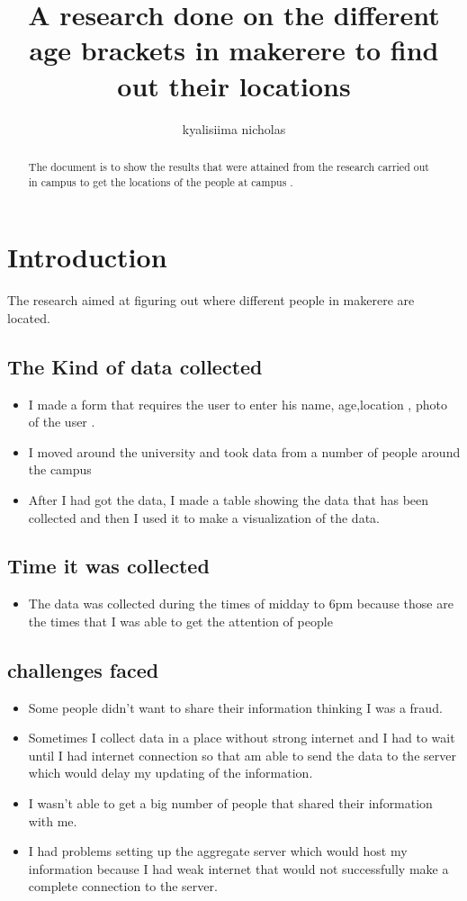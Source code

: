 \documentclass{article}
\begin{document}
\title{A research done on the different age brackets in makerere to find out  their locations}
\author{kyalisiima nicholas}

\maketitle

\begin{abstract}
The document is to show the results that were attained from the research carried out in campus to get the locations of the people at campus .
\end{abstract}

\section{Introduction}
The research aimed at figuring out where different people in makerere are located.

\subsection{The Kind of data collected}
\begin{itemize}
\item{I made a form that requires the user to enter his name, age,location , photo of the user .}
\item{I moved around the university and took data from a number of people around the campus}
\item{After I had got the data, I made a table showing the data that has been collected and then I used it to make a visualization of the data.} 
\end{itemize}

\subsection{Time it was collected}
\begin{itemize}
\item{The data was collected during the times of midday to 6pm because those are the times that I was able to get the attention of people}
\end{itemize}

\subsection{challenges faced}
\begin{itemize}
\item{Some people didn’t want to share their information thinking I was a fraud.}
\item{Sometimes I collect data in a place without strong internet and I had to wait until I had internet connection so that am able to send the data to the server which would delay my updating of the information.}
\item{I wasn’t able to get a big number of people that shared their information with me.}
\item{I had problems setting up the aggregate server which would host my information because I had weak internet that would not successfully make a complete connection to the server.}
\end{itemize}
\end{document}
